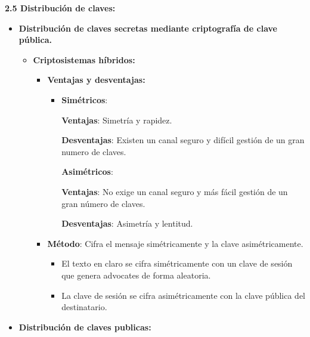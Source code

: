 \documentclass[12pt, twoside, openright]{report} %
\begin{document}
  
  \textbf{2.5 Distribución de claves:}
  

  \begin{itemize}
  \item \textbf{Distribución de claves secretas mediante criptografía de
    clave pública.}
    

    \begin{itemize}
    \item \textbf{Criptosistemas híbridos:}
      

      \begin{itemize}
      \item \textbf{Ventajas y desventajas:}
        

        \begin{itemize}
        \item \textbf{Simétricos}:
          

          
		  
            \textbf{Ventajas}: Simetría y rapidez.
        
			
            \textbf{Desventajas}: Existen un canal seguro y difícil
            gestión de un gran numero de claves.
       
			
          \textbf{Asimétricos}:
        
		  
            \textbf{Ventajas}: No exige un canal seguro y más fácil
            gestión de un gran número de claves.
          
			
            \textbf{Desventajas}: Asimetría y lentitud.
           
			
        \end{itemize}
      \item \textbf{Método}: Cifra el mensaje simétricamente y la clave
        asimétricamente.
        

        \begin{itemize}
        \item El texto en claro se cifra simétricamente con un clave de
          sesión que genera advocates de forma aleatoria.
          
        \item La clave de sesión se cifra asimétricamente con la clave
          pública del destinatario.
          
        \end{itemize}
      \end{itemize}
    \end{itemize}
  \item \textbf{Distribución de claves publicas:}
    


\end{itemize}
\end{document}
